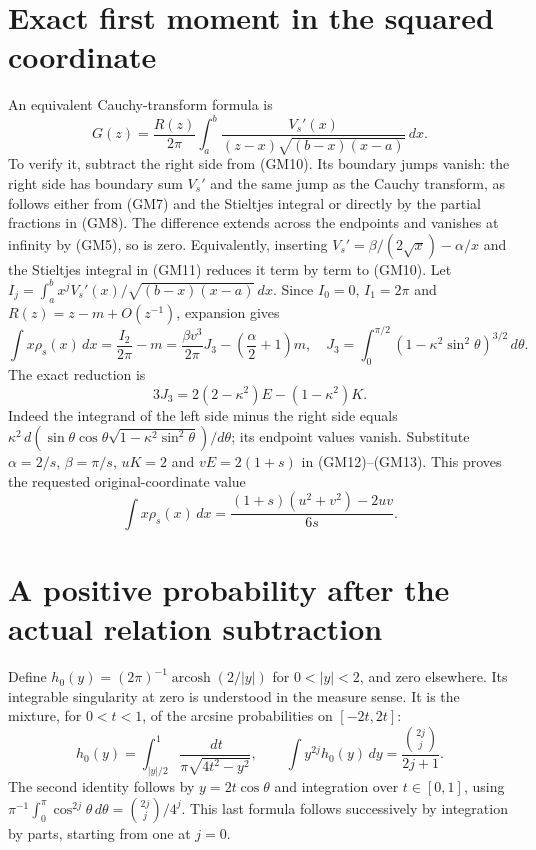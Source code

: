 \documentclass[11pt]{article}
\newcommand{\dd}{\,d}\newcommand{\R}{\mathbb R}
\begin{document}
\section{Exact first moment in the squared coordinate}
An equivalent Cauchy-transform formula is
\begin{equation}\tag{GM11}
 G(z)=\frac{R(z)}{2\pi}
 \int_a^b\frac{V_s'(x)}{(z-x)\sqrt{(b-x)(x-a)}}\dd x.
\end{equation}
To verify it, subtract the right side from (GM10). Its boundary jumps
vanish: the right side has boundary sum $V_s'$ and the same jump as
the Cauchy transform, as follows either from (GM7) and the Stieltjes
integral or directly by the partial fractions in (GM8).
The difference extends across the endpoints and vanishes at infinity
by (GM5), so is zero. Equivalently, inserting
$V_s'=\beta/(2\sqrt x)-\alpha/x$ and the Stieltjes integral in (GM11)
reduces it term by term to (GM10).
Let $I_j=\int_a^b x^jV_s'(x)/\sqrt{(b-x)(x-a)}\dd x$.
Since $I_0=0$, $I_1=2\pi$ and $R(z)=z-m+O(z^{-1})$, expansion gives
\begin{equation}\tag{GM12}
 \int x\rho_s(x)\dd x=\frac{I_2}{2\pi}-m
 =\frac{\beta v^3}{2\pi}J_3-\left(\frac\alpha2+1\right)m,
 \quad J_3=\int_0^{\pi/2}(1-\kappa^2\sin^2\theta)^{3/2}\dd\theta.
\end{equation}
The exact reduction is
\begin{equation}\tag{GM13}
 3J_3=2(2-\kappa^2)E-(1-\kappa^2)K.
\end{equation}
Indeed the integrand of the left side minus the right side equals
$\kappa^2\,d(\sin\theta\cos\theta
\sqrt{1-\kappa^2\sin^2\theta})/d\theta$; its endpoint values vanish.
Substitute $\alpha=2/s$, $\beta=\pi/s$, $uK=2$ and $vE=2(1+s)$
in (GM12)--(GM13). This proves the requested original-coordinate value
\begin{equation}\tag{GM14}
 \boxed{\displaystyle\int x\rho_s(x)\dd x
 =\frac{(1+s)(u^2+v^2)-2uv}{6s}.}
\end{equation}

\section{A positive probability after the actual relation subtraction}
Define $h_0(y)=(2\pi)^{-1}\operatorname{arcosh}(2/|y|)$ for $0<|y|<2$,
and zero elsewhere. Its integrable singularity at zero is understood in
the measure sense. It is the mixture, for $0<t<1$, of the arcsine
probabilities on $[-2t,2t]$:
\begin{equation}\tag{GM15}
 h_0(y)=\int_{|y|/2}^1\frac{\dd t}{\pi\sqrt{4t^2-y^2}},\qquad
 \int y^{2j}h_0(y)\dd y=\frac{\binom{2j}j}{2j+1}.
\end{equation}
The second identity follows by $y=2t\cos\theta$ and integration over
$t\in[0,1]$, using
$\pi^{-1}\int_0^\pi\cos^{2j}\theta\dd\theta=\binom{2j}j/4^j$.
This last formula follows successively by integration by parts, starting
from one at $j=0$.
\end{document}
